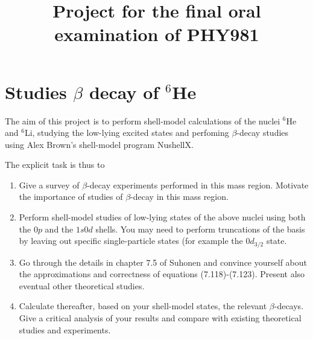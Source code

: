 \documentclass[prc]{revtex4}
\begin{document}
\title{Project for the final oral examination of PHY981}
\maketitle
\section*{Studies $\beta$ decay of $^{6}$He}

The aim of this project is to perform shell-model calculations of the nuclei $^{6}$He and $^{6}$Li, studying the low-lying excited states 
and perfoming $\beta$-decay studies using Alex Brown's shell-model program NushellX. 

The explicit task is thus to
\begin{enumerate}
\item Give a survey of $\beta$-decay experiments performed in this mass region. Motivate the importance of studies of $\beta$-decay in this mass region.
\item Perform shell-model studies of low-lying states of the above nuclei using both the $0p$ and the $1s0d$ shells. You may need to perform truncations
of the basis by leaving out specific single-particle states (for example the $0d_{3/2}$ state. 
\item Go through the details in chapter 7.5 of Suhonen and convince yourself about the approximations and correctness of equations (7.118)-(7.123). 
Present also eventual other theoretical studies.
\item Calculate thereafter, based on your shell-model states, the relevant $\beta$-decays.
Give a critical analysis of your results and compare with existing theoretical studies and experiments.
\end{enumerate}
\end{document}
